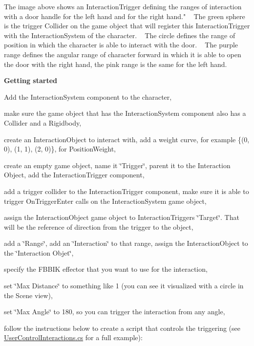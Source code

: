 The image above shows an Interaction\+Trigger defining the ranges of interaction with a door handle for the left hand and for the right hand." ~\newline
The green sphere is the trigger Collider on the game object that will register this Interaction\+Trigger with the Interaction\+System of the character. ~\newline
The circle defines the range of position in which the character is able to interact with the door. ~\newline
The purple range defines the angular range of character forward in which it is able to open the door with the right hand, the pink range is the same for the left hand.

{\bfseries Getting started}
\begin{DoxyItemize}
\item Add the Interaction\+System component to the character,
\item make sure the game object that has the Interaction\+System component also has a Collider and a Rigidbody,
\item create an Interaction\+Object to interact with, add a weight curve, for example \{(0, 0), (1, 1), (2, 0)\}, for Position\+Weight,
\item create an empty game object, name it \char`\"{}\+Trigger\char`\"{}, parent it to the Interaction Object, add the Interaction\+Trigger component,
\item add a trigger collider to the Interaction\+Trigger component, make sure it is able to trigger On\+Trigger\+Enter calls on the Interaction\+System game object,
\item assign the Interaction\+Object game object to Interaction\+Trigger\textquotesingle{}s \char`\"{}\+Target\char`\"{}. That will be the reference of direction from the trigger to the object,
\item add a \char`\"{}\+Range\char`\"{}, add an \char`\"{}\+Interaction\char`\"{} to that range, assign the Interaction\+Object to the \char`\"{}\+Interaction Objet\char`\"{},
\item specify the F\+B\+B\+IK effector that you want to use for the interaction,
\item set \char`\"{}\+Max Distance\char`\"{} to something like 1 (you can see it visualized with a circle in the Scene view),
\item set \char`\"{}\+Max Angle\char`\"{} to 180, so you can trigger the interaction from any angle,
\item follow the instructions below to create a script that controls the triggering (see \mbox{\hyperlink{_user_control_interactions_8cs}{User\+Control\+Interactions.\+cs}} for a full example)\+:
\end{DoxyItemize}

